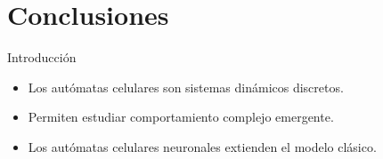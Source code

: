 \section{Conclusiones}

\begin{frame}{Introducción}
	\begin{itemize}
		\item Los autómatas celulares son sistemas dinámicos discretos.
		\item Permiten estudiar comportamiento complejo emergente.
		\item Los autómatas celulares neuronales extienden el modelo clásico.
	\end{itemize}
\end{frame}
